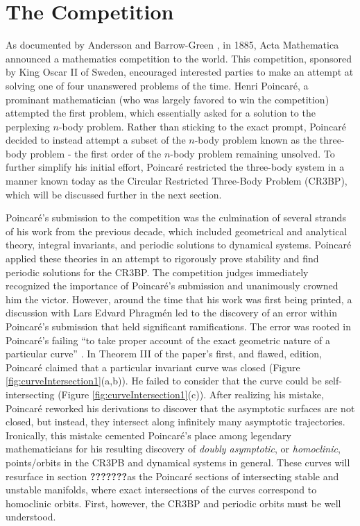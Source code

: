 \documentclass[11pt]{article} %
\begin{document}
\section*{The Competition}
As documented by Andersson and Barrow-Green \cite{Andersson1994,BarrowGreen1994}, in 1885, Acta Mathematica announced a mathematics competition to the world. This competition, sponsored by King Oscar II of Sweden, encouraged interested parties to make an attempt at solving one of four unanswered problems of the time. Henri Poincaré, a prominant mathematician (who was largely favored to win the competition) attempted the first problem, which essentially asked for a solution to the perplexing $n$-body problem. Rather than sticking to the exact prompt, Poincaré decided to instead attempt a subset of the $n$-body problem known as the three-body problem - the first order of the $n$-body problem remaining unsolved. To further simplify his initial effort, Poincaré restricted the three-body system in a manner known today as the Circular Restricted Three-Body Problem (CR3BP), which will be discussed further in the next section.

Poincaré's submission to the competition was the culmination of several strands of his work from the previous decade, which included geometrical and analytical theory, integral invariants, and periodic solutions to dynamical systems. Poincaré applied these theories in an attempt to rigorously prove stability and find periodic solutions for the CR3BP. The competition judges immediately recognized the importance of Poincaré's submission and unanimously crowned him the victor. However, around the time that his work was first being printed, a discussion with Lars Edvard Phragmén led to the discovery of an error within Poincaré's submission that held significant ramifications. The error was rooted in Poincaré's failing ``to take proper account of the exact geometric nature of a particular curve'' \cite{BarrowGreen1997}. In Theorem III of the paper's first, and flawed, edition, Poincaré claimed that a particular invariant curve was closed (Figure \ref{fig:curveIntersection1}(a,b)). He failed to consider that the curve could be self-intersecting (Figure \ref{fig:curveIntersection1}(c)). After realizing his mistake, Poincaré reworked his derivations to discover that the asymptotic surfaces are not closed, but instead, they intersect along infinitely many asymptotic trajectories. Ironically, this mistake cemented Poincaré's place among legendary mathematicians for his resulting discovery of \textit{doubly asymptotic}, or \textit{homoclinic}, points/orbits in the CR3PB and dynamical systems in general. These curves will resurface in section \huge\color{red}\textbf{???????}\color{black}\normalsize as the Poincaré sections of intersecting stable and unstable manifolds, where exact intersections of the curves correspond to homoclinic orbits. First, however, the CR3BP and periodic orbits must be well understood.
\end{document}
